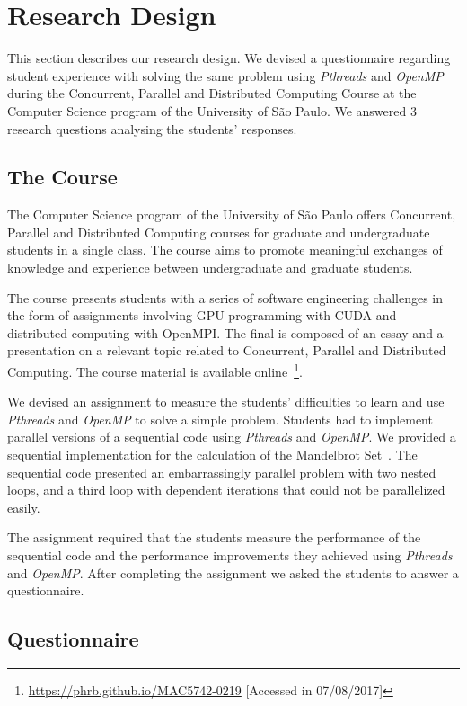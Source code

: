 \section{Research Design}
\label{sec:researchdesign}

This section describes our research design. We devised a questionnaire
regarding student experience with solving the same problem using
\textit{Pthreads} and \textit{OpenMP} during the Concurrent, Parallel and
Distributed Computing Course at the Computer Science program of the University
of São Paulo. We answered 3 research questions analysing the students'
responses.

\subsection{The Course}

The Computer Science program of the University of São Paulo offers Concurrent,
Parallel and Distributed Computing courses for graduate and undergraduate
students in a single class. The course aims to promote meaningful exchanges of
knowledge and experience between undergraduate and graduate students.

The course presents students with a series of software engineering challenges
in the form of assignments involving GPU programming with CUDA and distributed
computing with OpenMPI. The final is composed of an essay and a presentation on
a relevant topic related to Concurrent, Parallel and Distributed Computing.
The course material is available
online~\footnote{\url{https://phrb.github.io/MAC5742-0219} [Accessed in
07/08/2017]}.

We devised an assignment to measure the students' difficulties to learn and use
\textit{Pthreads} and \textit{OpenMP} to solve a simple problem. Students had
to implement parallel versions of a sequential code using \textit{Pthreads} and
\textit{OpenMP}.  We provided a sequential implementation for the calculation
of the Mandelbrot Set~\cite{douady1984etude}. The sequential code presented an
embarrassingly parallel problem with two nested loops, and a third loop with
dependent iterations that could not be parallelized easily.

The assignment required that the students measure the performance of the
sequential code and the performance improvements they achieved using
\textit{Pthreads} and \textit{OpenMP}. After completing the assignment we asked
the students to answer a questionnaire.

\subsection{Questionnaire}

